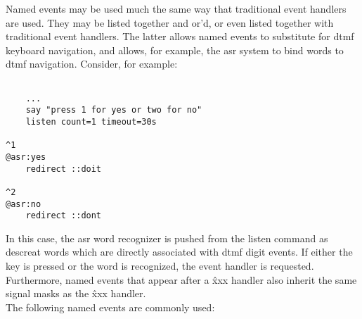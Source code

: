 \documentclass[a4paper,12pt]{article}
\begin{document}
Named events may be used much the same way that traditional event
handlers are used.  They may be listed together and or'd, or even listed
together with traditional event handlers.  The latter allows named
events to substitute for dtmf keyboard navigation, and allows, for
example, the asr system to bind words to dtmf navigation.  Consider, for
example: \\

\begin{verbatim}

	...
	say "press 1 for yes or two for no"
	listen count=1 timeout=30s

^1
@asr:yes
	redirect ::doit

^2
@asr:no
	redirect ::dont
\end{verbatim}

In this case, the asr word recognizer is pushed from the listen command
as descreat words which are directly associated with dtmf digit events. 
If either the key is pressed or the word is recognized, the event
handler is requested.  Furthermore, named events that appear after a
\^xxx handler also inherit the same signal masks as the \^xxx handler. \\

The following named events are commonly used: \\
\end{document}
